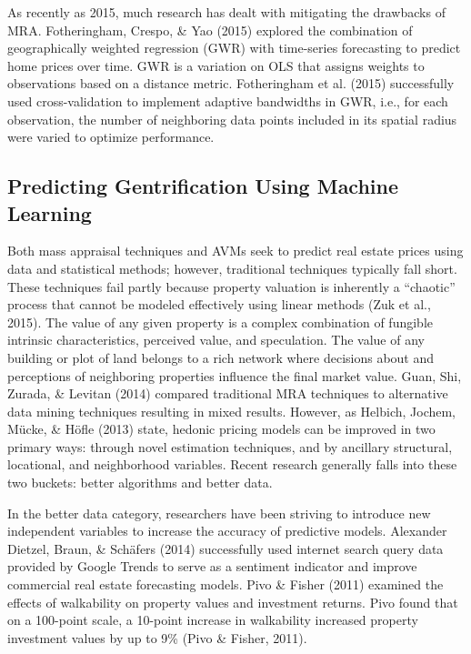 \documentclass[12pt,]{article}
\begin{document}
As recently as 2015, much research has dealt with mitigating the
drawbacks of MRA. Fotheringham, Crespo, \& Yao (2015) explored the
combination of geographically weighted regression (GWR) with time-series
forecasting to predict home prices over time. GWR is a variation on OLS
that assigns weights to observations based on a distance metric.
Fotheringham et al. (2015) successfully used cross-validation to
implement adaptive bandwidths in GWR, i.e., for each observation, the
number of neighboring data points included in its spatial radius were
varied to optimize performance.

\hypertarget{predicting-gentrification-using-machine-learning}{%
\subsection{Predicting Gentrification Using Machine
Learning}\label{predicting-gentrification-using-machine-learning}}

Both mass appraisal techniques and AVMs seek to predict real estate
prices using data and statistical methods; however, traditional
techniques typically fall short. These techniques fail partly because
property valuation is inherently a ``chaotic'' process that cannot be
modeled effectively using linear methods (Zuk et al., 2015). The value
of any given property is a complex combination of fungible intrinsic
characteristics, perceived value, and speculation. The value of any
building or plot of land belongs to a rich network where decisions about
and perceptions of neighboring properties influence the final market
value. Guan, Shi, Zurada, \& Levitan (2014) compared traditional MRA
techniques to alternative data mining techniques resulting in mixed
results. However, as Helbich, Jochem, Mücke, \& Höfle (2013) state,
hedonic pricing models can be improved in two primary ways: through
novel estimation techniques, and by ancillary structural, locational,
and neighborhood variables. Recent research generally falls into these
two buckets: better algorithms and better data.

In the better data category, researchers have been striving to introduce
new independent variables to increase the accuracy of predictive models.
Alexander Dietzel, Braun, \& Schäfers (2014) successfully used internet
search query data provided by Google Trends to serve as a sentiment
indicator and improve commercial real estate forecasting models. Pivo \&
Fisher (2011) examined the effects of walkability on property values and
investment returns. Pivo found that on a 100-point scale, a 10-point
increase in walkability increased property investment values by up to
9\% (Pivo \& Fisher, 2011).
\end{document}
